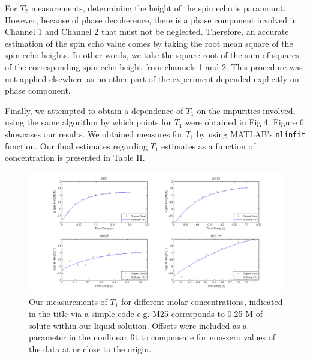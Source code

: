 \documentclass[aps,prl,nofootinbib,twocolumn,superscriptaddress,groupedaddress]{revtex4}  %
\begin{document}
For $T_{2}$ measurements, determining the height of the spin echo is paramount. However, because of phase decoherence, there is a phase component involved in Channel 1 and Channel 2 that must not be neglected. Therefore, an accurate estimation of the spin echo value comes by taking the root mean square of the spin echo heights. In other words, we take the square root of the sum of squares of the corresponding spin echo height from channels 1 and 2. This procedure was not applied elsewhere as no other part of the experiment depended explicitly on phase component.

Finally, we attempted to obtain a dependence of $T_{1}$ on the impurities involved, using the same algorithm by which points for $T_{1}$ were obtained in Fig 4. Figure 6 showcases our results. We obtained measures for $T_{1}$ by using MATLAB's \texttt{nlinfit} function. Our final estimates regarding $T_{1}$ estimates as a function of concentration is presented in Table II.

\onecolumngrid

\begin{figure}[b]
\centering
\includegraphics[width = \textwidth]{../Analysis/impurity.png}
\caption{Our measurements of $T_{1}$ for different molar concentrations, indicated in the title via a simple code e.g. M25 corresponds to 0.25 M of solute within our liquid solution. Offsets were included as a parameter in the nonlinear fit to compensate for non-zero values of the data at or close to the origin.}
\end{figure}
\end{document}
